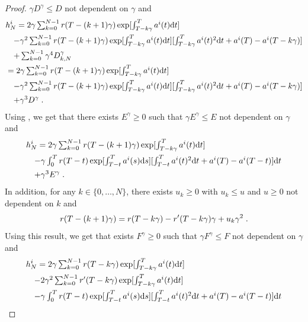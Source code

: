\begin{proof}
$\gamma D^\gamma \leq D$ not dependent on $\gamma$ and
\begin{align}
  &h_N^i = \textstyle{2 \gamma \sum_{k=0}^{N-1}  r(T - (k + 1) \gamma) \exp[\int_{T - k \gamma}^{T} a^i(t) \mathrm{d}t ]} \\
        & \quad  \textstyle{- \gamma^2 \sum_{k=0}^{N-1} r(T - (k + 1) \gamma) \exp[\int_{T - k \gamma}^{T} a^i(t) \mathrm{d}t ][\int_{T - k \gamma}^{T} a^i(t)^2 \mathrm{d}t + a^i(T) - a^i(T - k \gamma)] } \\
        & \quad \textstyle{  + \sum_{k=0}^{N-1}  \gamma^4 D_{k, N}^\gamma} \\
&= \textstyle{2 \gamma \sum_{k=0}^{N-1}  r(T - (k + 1) \gamma) \exp[\int_{T - k \gamma}^{T} a^i(t) \mathrm{d}t ]} \\
        & \quad  \textstyle{- \gamma^2 \sum_{k=0}^{N-1} r(T - (k + 1) \gamma) \exp[\int_{T - k \gamma}^{T} a^i(t) \mathrm{d}t ][\int_{T - k \gamma}^{T} a^i(t)^2 \mathrm{d}t + a^i(T) - a^i(T - k \gamma)] } \\
  & \quad \textstyle{  + \gamma^3  D^\gamma \;. }   
\end{align}
Using , we get that there exists $E^\gamma \geq 0$ such that
$\gamma E^\gamma \leq E$ not dependent on $\gamma$ and
\begin{align}
  &h_N^i = \textstyle{2 \gamma \sum_{k=0}^{N-1}  r(T - (k + 1) \gamma) \exp[\int_{T - k \gamma}^{T} a^i(t) \mathrm{d}t ]} \\
  & \quad  \textstyle{- \gamma \int_0^T r(T - t) \exp[\int_{T - t}^{T} a^i(s) \mathrm{d}s ][\int_{T - t}^{T} a^i(t)^2 \mathrm{d}t + a^i(T) - a^i(T - t)] \mathrm{d}t } \\
  & \quad \textstyle{  + \gamma^3  E^\gamma \;. }     
\end{align}
In addition, for any $k \in \{0, \dots, N\}$, there exists $u_k \geq 0$ with
$u_k \leq u$ and $u \geq 0$ not dependent on $k$ and
\begin{equation}
  r(T-(k+1)\gamma) = r(T-k\gamma) -r'(T-k \gamma)\gamma + u_k \gamma^2 \; . 
\end{equation}
Using this result, we get that exists $F^\gamma \geq 0$ such that
$\gamma F^\gamma \leq F$ not dependent on $\gamma$ and
\begin{align}
  &h_N^i = \textstyle{2 \gamma \sum_{k=0}^{N-1}  r(T - k \gamma) \exp[\int_{T - k \gamma}^{T} a^i(t) \rmd t ]} \\
  & \quad \textstyle{-2\gamma^2 \sum_{k=0}^{N-1} r'(T-k \gamma) \exp[\int_{T - k \gamma}^{T} a^i(t) \rmd t ] } \\
  & \quad  \textstyle{- \gamma \int_0^T r(T - t) \exp[\int_{T - t}^{T} a^i(s) \rmd s ][\int_{T - t}^{T} a^i(t)^2 \rmd t + a^i(T) - a^i(T - t)] \rmd t } \\

\end{align}
\end{proof}

